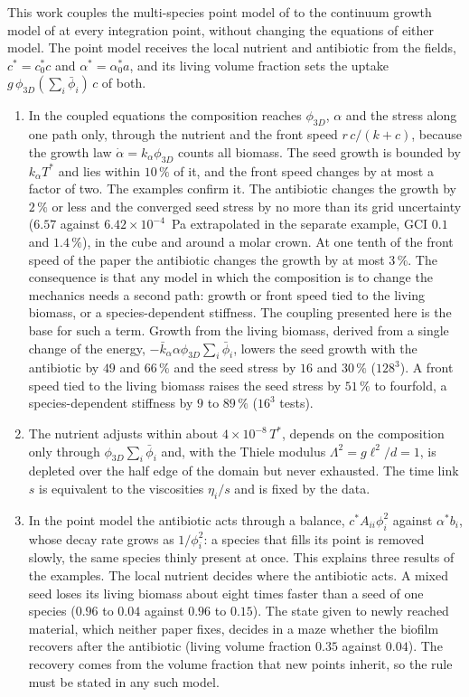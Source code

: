 \documentclass[11pt,a4paper]{article}
\newcommand{\phiD}{\phi_{3D}}
\newcommand{\lv}{\textstyle\sum_i\bar\phi_i}
\begin{document}
This work couples the multi-species point model of \citet{Klempt2026ContinuumBacterialGrowth} to the continuum growth model of \citet{Klempt2024DiffusionDrivenGrowth} at every integration point, without changing the equations of either model. The point model receives the local nutrient and antibiotic from the fields, $c^*=c^*_0c$ and $\alpha^*=\alpha^*_0a$, and its living volume fraction sets the uptake $g\,\phiD(\lv)\,c$ of both.
\begin{enumerate}
\item In the coupled equations the composition reaches $\phiD$, $\alpha$ and the stress along one path only, through the nutrient and the front speed $r\,c/(k+c)$, because the growth law $\dot\alpha=k_\alpha\phiD$ counts all biomass. The seed growth is bounded by $k_\alpha T^*$ and lies within $10\,\%$ of it, and the front speed changes by at most a factor of two. The examples confirm it. The antibiotic changes the growth by $2\,\%$ or less and the converged seed stress by no more than its grid uncertainty ($6.57$ against $6.42\times10^{-4}$~Pa extrapolated in the separate example, GCI $0.1$ and $1.4\,\%$), in the cube and around a molar crown. At one tenth of the front speed of the paper the antibiotic changes the growth by at most $3\,\%$. The consequence is that any model in which the composition is to change the mechanics needs a second path: growth or front speed tied to the living biomass, or a species-dependent stiffness. The coupling presented here is the base for such a term. Growth from the living biomass, derived from a single change of the energy, $-\bar k_\alpha\alpha\phiD\lv$, lowers the seed growth with the antibiotic by $49$ and $66\,\%$ and the seed stress by $16$ and $30\,\%$ ($128^3$). A front speed tied to the living biomass raises the seed stress by $51\,\%$ to fourfold, a species-dependent stiffness by $9$ to $89\,\%$ ($16^3$ tests).
\item The nutrient adjusts within about $4\times10^{-8}\,T^*$, depends on the composition only through $\phiD\lv$ and, with the Thiele modulus $\Lambda^2=g\ell^2/d=1$, is depleted over the half edge of the domain but never exhausted. The time link $s$ is equivalent to the viscosities $\eta_i/s$ and is fixed by the data.
\item In the point model the antibiotic acts through a balance, $c^*A_{ii}\phi_i^2$ against $\alpha^*b_i$, whose decay rate grows as $1/\phi_i^2$: a species that fills its point is removed slowly, the same species thinly present at once. This explains three results of the examples. The local nutrient decides where the antibiotic acts. A mixed seed loses its living biomass about eight times faster than a seed of one species ($0.96$ to $0.04$ against $0.96$ to $0.15$). The state given to newly reached material, which neither paper fixes, decides in a maze whether the biofilm recovers after the antibiotic (living volume fraction $0.35$ against $0.04$). The recovery comes from the volume fraction that new points inherit, so the rule must be stated in any such model.

\end{enumerate}
\end{document}
